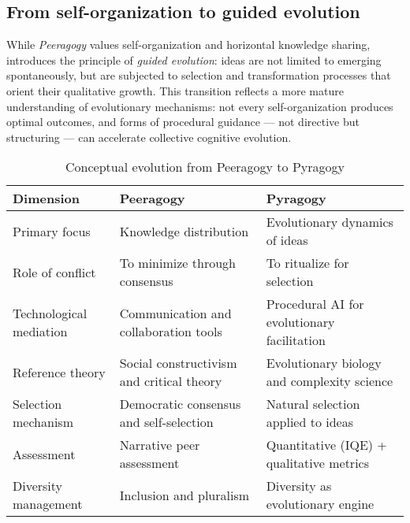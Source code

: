 \subsection{From self-organization to guided evolution}
While \textit{Peeragogy} values self-organization and horizontal knowledge sharing, \pyragogy{} introduces the principle of \textit{guided evolution}: ideas are not limited to emerging spontaneously, but are subjected to selection and transformation processes that orient their qualitative growth. This transition reflects a more mature understanding of evolutionary mechanisms: not every self-organization produces optimal outcomes, and forms of procedural guidance --- not directive but structuring --- can accelerate collective cognitive evolution.
	
\vspace{0.5cm}

\begin{table}[h]
	\centering
	\renewcommand{\arraystretch}{1.3} %
	\setlength{\tabcolsep}{6pt}       %
	\caption{Conceptual evolution from Peeragogy to Pyragogy}
	\label{tab:peeragogy-pyragogy-evolution}
	\begin{tabularx}{\textwidth}{>{\raggedright\arraybackslash}p{3.5cm} 
			>{\raggedright\arraybackslash}X 
			>{\raggedright\arraybackslash}X}
		\toprule
		\textbf{Dimension} & \textbf{Peeragogy} & \textbf{Pyragogy} \\
		\midrule
		Primary focus          & Knowledge distribution & Evolutionary dynamics of ideas \\
		Role of conflict       & To minimize through consensus & To ritualize for selection \\
		Technological mediation& Communication and collaboration tools & Procedural AI for evolutionary facilitation \\
		Reference theory       & Social constructivism and critical theory & Evolutionary biology and complexity science \\
		Selection mechanism    & Democratic consensus and self-selection & Natural selection applied to ideas \\
		Assessment             & Narrative peer assessment & Quantitative (IQE) + qualitative metrics \\
		Diversity management   & Inclusion and pluralism & Diversity as evolutionary engine \\
		\bottomrule
	\end{tabularx}
\end{table}

